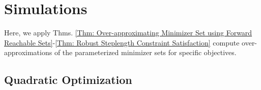 \documentclass[letterpaper, 10 pt, conference]{ieeeconf}
\newcommand{\?}{\stackrel{?}{=}}
\newcommand{\var}{\xi}
\newcommand{\varOptSet}{S_\var^\star}
\newcommand{\frank}[1]{{\textcolor[rgb]{0,0,1}{\textsf{[Frank: {#1}]}}}}
\newcommand{\antoine}[1]{{\textcolor[rgb]{1,0,0}{\textsf{[Antoine: {#1}]}}}}
\begin{document}
\section{Simulations}
\label{sec: Experiments}
Here, we apply Thms. \ref{Thm: Over-approximating Minimizer Set using Forward Reachable Sets}-\ref{Thm: Robust Steplength Constraint Satisfaction} compute over-approximations of the parameterized minimizer sets for specific objectives.





\subsection{Quadratic Optimization}
\label{subsec: ex_quadratic_optim}
\end{document}
